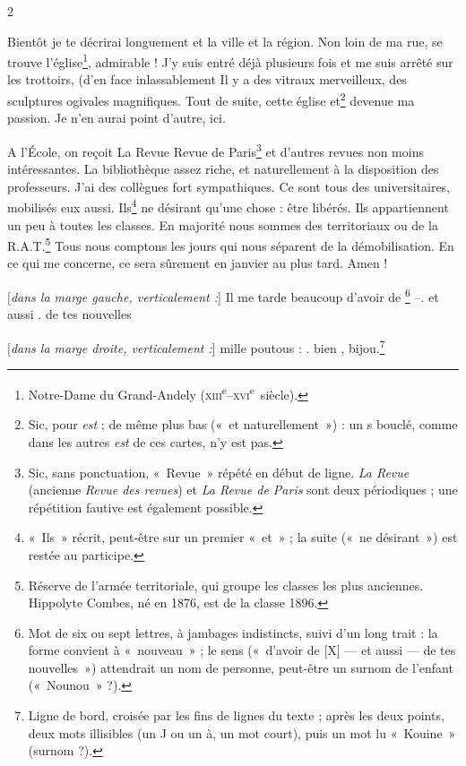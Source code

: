 \begin{LJlettre}
 2\par\nopagebreak[4]

Bientôt je te décrirai longuement et la ville et la région. Non loin de ma rue, se trouve l'église\footnote{Notre-Dame du Grand-Andely (\textsc{xiii}\textsuperscript{e}--\textsc{xvi}\textsuperscript{e}~siècle).}, admirable ! J'y suis entré déjà plusieurs fois et me suis arrêté sur les trottoirs, (d'en face inlassablement Il y a des vitraux merveilleux, des sculptures ogivales magnifiques. Tout de suite, cette église et\footnote{Sic, pour \textit{est} ; de même plus bas («~et naturellement~») : un s bouclé, comme dans les autres \textit{est} de ces cartes, n'y est pas.} devenue ma passion. Je n'en aurai point d'autre, ici.

A l'École, on reçoit La Revue Revue de Paris\footnote{Sic, sans ponctuation, «~Revue~» répété en début de ligne. \textit{La Revue} (ancienne \textit{Revue des revues}) et \textit{La Revue de Paris} sont deux périodiques ; une répétition fautive est également possible.} et d'autres revues non moins intéressantes. La bibliothèque assez riche, et naturellement à la disposition des professeurs. J'ai des collègues fort sympathiques. Ce sont tous des universitaires, mobilisés eux aussi. Ils\footnote{«~Ils~» récrit, peut-être sur un premier «~et~» ; la suite («~ne désirant~») est restée au participe.} ne désirant qu'une chose : être libérés. Ils appartiennent un peu à toutes les classes. En majorité nous sommes des territoriaux ou de la R.A.T.\footnote{Réserve de l'armée territoriale, qui groupe les classes les plus anciennes. Hippolyte Combes, né en 1876, est de la classe 1896.} Tous nous comptons les jours qui nous séparent de la démobilisation. En ce qui me concerne, ce sera sûrement en janvier au plus tard. Amen !

[\textit{dans la marge gauche, verticalement :}] Il me tarde beaucoup d'avoir de \footnote{Mot de six ou sept lettres, à jambages indistincts, suivi d'un long trait : la forme convient à «~nouveau~» ; le sens («~d'avoir de [X] --- et aussi --- de tes nouvelles~») attendrait un nom de personne, peut-être un surnom de l'enfant («~Nounou~» ?).} --. et aussi . de tes nouvelles

[\textit{dans la marge droite, verticalement :}] mille  poutous :  \label{annexe:doc5-kouine}. bien , bijou.\footnote{Ligne de bord, croisée par les fins de lignes du texte ; après les deux points, deux mots illisibles (un J ou un à, un mot court), puis un mot lu «~Kouine~» (surnom ?).}
\end{LJlettre}

